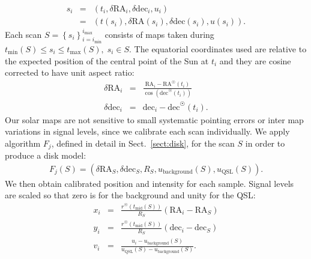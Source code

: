 \documentclass{aa}
\newcommand{\eqnl}[2]{\begin{eqnarray}\label{#1}#2\end{eqnarray}}
\newcommand{\s}[2]{{#1}_{\mathrm{#2}}}
\begin{document}
\eqnl{radio_sample}{
s_i &=& 
\left( t_i, \delta \mathrm{RA}_i, \delta \mathrm{dec}_i, u_i \right) \\ \nonumber
&=& \left( t(s_i), \delta \mathrm{RA}(s_i), \delta \mathrm{dec}(s_i), u(s_i) \right) \text{.}
}
Each scan $S = \left\{ s_i \right\}_{i=\s{i}{min}}^{\s{i}{max}}$ consists of maps taken 
during $\s{t}{min}(S) \le s_i \le \s{t}{max}(S), \; s_i \in S$.
The equatorial coordinates used are relative to the expected position of the central point
of the Sun at $t_i$ and they are cosine corrected to have unit aspect ratio:
\eqnl{relative_radec}{
\delta \mathrm{RA}_i  &=& \frac{\mathrm{RA}_i - \mathrm{RA}^{\astrosun}(t_i)}{\cos \left( \mathrm{dec}^{\astrosun}(t_i) \right)} \\
\delta \mathrm{dec}_i &=& \mathrm{dec}_i - \mathrm{dec}^{\astrosun}(t_i) \text{.}
}
Our solar maps are not sensitive to small systematic pointing errors or inter map variations in signal levels, since we calibrate each scan individually.
We apply algorithm $F_j$,
defined in detail in Sect.~\ref{sect:disk},
for the scan $S$ in order to produce a disk model:
\eqnl{disk_model}{
F_j(S) = \left( \delta \mathrm{RA}_S, \delta \mathrm{dec}_S, R_S, \s{u}{background}(S), \s{u}{QSL}(S) \right) \text{.}
}
We then obtain calibrated position and intensity for each sample. Signal levels are scaled so that zero is for the background and unity for the 
QSL:
\eqnl{calibration}{
x_i &=& \frac{r^{\astrosun} \left( \s{t}{mid}(S) \right)}{R_S} \left( \mathrm{RA}_i -  \mathrm{RA}_S  \right) \\
y_i &=& \frac{r^{\astrosun} \left( \s{t}{mid}(S) \right)}{R_S} \left( \mathrm{dec}_i - \mathrm{dec}_S \right) \\
v_i &=& \frac{u_i - \s{u}{background}(S)}{\s{u}{QSL}(S) - \s{u}{background}(S)} \text{.}
}
\end{document}
